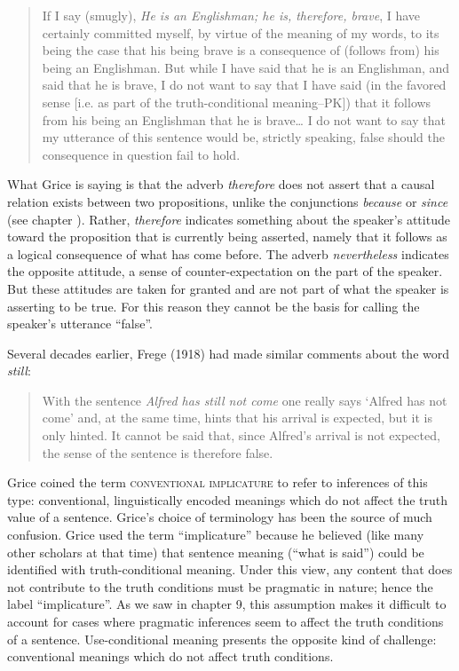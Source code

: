 \begin{quote}
If I say (smugly), \textit{He is an Englishman; he is, therefore, brave}, I have certainly committed myself, by virtue of the meaning of my words, to its being the case that his being brave is a consequence of (follows from) his being an Englishman. But while I have said that he is an Englishman, and said that he is brave, I do not want to say that I have said (in the favored sense [i.e. as part of the truth-conditional meaning–PK]) that it follows from his being an Englishman that he is brave…  I do not want to say that my utterance of this sentence would be, strictly speaking, false should the consequence in question fail to hold.\hfill\citep[44]{Grice1975}\hbox{}
\end{quote}


What Grice is saying is that the adverb \textit{therefore} does not assert that a causal relation exists between two propositions, unlike the conjunctions \textit{because} or \textit{since} (see chapter ). Rather, \textit{therefore} indicates something about the speaker’s attitude toward the proposition that is currently being asserted, namely that it follows as a logical consequence of what has come before. The adverb \textit{nevertheless} indicates the opposite attitude, a sense of counter-expectation on the part of the speaker. But these attitudes are taken for granted and are not part of what the speaker is asserting to be true. For this reason they cannot be the basis for calling the speaker’s utterance “false”.



Several decades earlier, Frege (1918) had made similar comments about the word \textit{still}:


\begin{quote}
With the sentence \textit{Alfred has still not come} one really says ‘Alfred has not come’ and, at the same time, hints that his arrival is expected, but it is only hinted. It cannot be said that, since Alfred’s arrival is not expected, the sense of the sentence is therefore false.\hfill\citep{Frege1918}\hbox{}
\end{quote}



Grice coined the term \textsc{conventional implicature} to refer to inferences of this type: conventional, linguistically encoded meanings which do not affect the truth value of a sentence. Grice’s choice of terminology has been the source of much confusion. Grice used the term “implicature” because he believed (like many other scholars at that time) that sentence meaning (“what is said”) could be identified with truth-conditional meaning. Under this view, any content that does not contribute to the truth conditions must be pragmatic in nature; hence the label “implicature”. As we saw in chapter 9, this assumption makes it difficult to account for cases where pragmatic inferences seem to affect the truth conditions of a sentence. Use-conditional meaning presents the opposite kind of challenge: conventional meanings which do not affect truth conditions.



